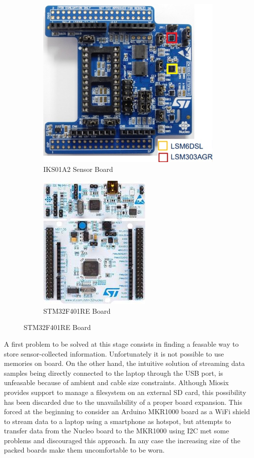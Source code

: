 \begin{figure}[H]
	\centering
	\begin{subfigure}[H]{0.45\textwidth}
		\includegraphics[scale=0.8]{figures/iks01a2.jpg} 
		\caption{IKS01A2 Sensor Board}\label{fig:2a}
	\end{subfigure}
	\hfill
	\begin{subfigure}[H]{0.45\textwidth}
		\includegraphics[scale=0.8]{figures/stm32f401re.jpg} 
		\caption{STM32F401RE Board}\label{fig:2b}
	\end{subfigure}
\end{figure}
A first problem to be solved at this stage consists in finding a feasable way to store sensor-collected information.\newline
Unfortunately it is not possible to use memories on board. On the other hand, the intuitive solution of streaming data samples being directly connected to the laptop through the USB port, is unfeasable because of ambient and cable size constraints. Although Miosix provides support to manage a filesystem on an external SD card, this possibility has been discarded due to the unavailability of a proper board expansion. This forced at the beginning to consider an Arduino MKR1000 board as a WiFi shield to stream data to a laptop using a smartphone as hotspot, but attempts to transfer data from the Nucleo board to the MKR1000 using I2C met some problems and discouraged this approach. In any case the increasing size of the packed boards make them uncomfortable to be worn.\newline
